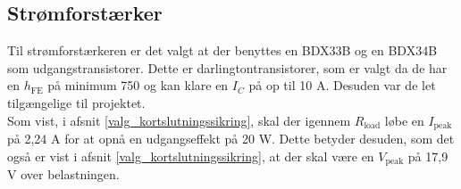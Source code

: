 \subsection*{Strømforstærker}
\label{effekt_stroemforstaerker}
Til strømforstærkeren er det valgt at der benyttes en BDX33B og en BDX34B  som udgangstransistorer. Dette er darlingtontransistorer, som er valgt da de har en $h_{\mathrm{FE}}$ på minimum 750 og kan klare en $I_C$ på op til 10 A. Desuden var de let tilgængelige til projektet.\\
Som vist, i afsnit \ref{valg_kortslutningssikring}, skal der igennem $R_{\mathrm{load}}$ løbe en $I_{\mathrm{peak}}$ på 2,24 A for at opnå en udgangseffekt på 20 W. Dette betyder desuden, som det også er vist i afsnit \ref{valg_kortslutningssikring}, at der skal være en $V_{\mathrm{peak}}$ på 17,9 V over belastningen. %
